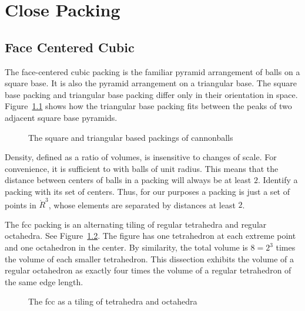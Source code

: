 

\chapter{Close Packing}
\section{Face Centered Cubic}



The face-centered cubic packing is the familiar pyramid arrangement of
balls on a square base.  It is also the pyramid arrangement on a
triangular base.  The square base packing and triangular base packing
differ only in their orientation in space.
Figure~\ref{fig:tri-square-cannonballs} shows how the triangular base
packing fits between the peaks of two adjacent square base pyramids.

\begin{figure}[htb]
  \centering
  \caption{The square and triangular based packings of cannonballs}
  \label{fig:tri-square-cannonballs}
\end{figure}

Density, defined as a ratio of volumes, is insensitive to changes of
scale.  For convenience, it is sufficient to with balls of unit
radius. This means that the distance between centers of balls in a
packing will always be at least $2$.  Identify a packing with its set
of centers.  Thus, for our purposes a packing is just a set of points
in $\ring{R}^3$, whose elements are separated by distances at least
$2$.


The fcc packing is an alternating tiling of regular tetrahedra and
regular octahedra.  See Figure~\ref{fig:tet-oct}.  The figure has one
tetrahedron at each extreme point and one octahedron in the center. By
similarity, the total volume is $8 = 2^3$ times the volume of each
smaller tetrahedron. This dissection exhibits the volume of a regular
octahedron as exactly four times the volume of a regular tetrahedron
of the same edge length.

\begin{figure}[htb]
  \centering
  \caption{The fcc as a tiling of tetrahedra and octahedra}
  \label{fig:tet-oct}
\end{figure}

